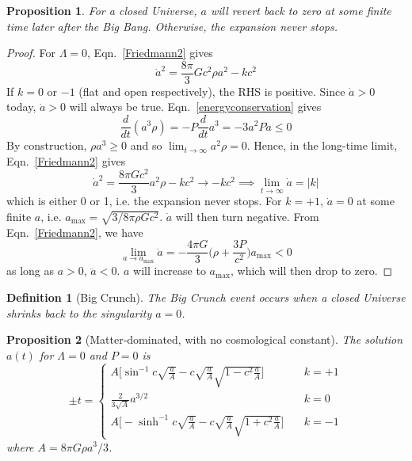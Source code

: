 \documentclass[a4paper]{article}
\theoremstyle{new}
\newtheorem{defi}{Definition}[section]
\newtheorem{prop}{Proposition}[section]
\begin{document}
\begin{prop}
For a closed Universe, $a$ will revert back to zero at some finite time later after the Big Bang. Otherwise, the expansion never stops.
\end{prop}
\begin{proof}
For $\Lambda=0$, Eqn.~\ref{Friedmann2} gives
$$\dot{a}^2=\frac{8\pi}{3}Gc^2\rho a^2-kc^2$$
If $k=0$ or $-1$ (flat and open respectively), the RHS is positive. Since $\dot{a}>0$ today, $\dot{a}>0$ will always be true. Eqn.~\ref{energyconservation} gives
$$\frac{d}{dt}(a^3\rho)=-P\frac{d}{dt}a^3=-3a^2P\dot{a}\leq 0$$
By construction, $\rho a^3\geq0$ and so $\lim_{t\rightarrow\infty}a^2\rho=0$. Hence, in the long-time limit, Eqn.~\ref{Friedmann2} gives
$$\dot{a}^2=\frac{8\pi Gc^2}{3}a^2\rho -kc^2\rightarrow-kc^2\implies\lim_{t\rightarrow\infty}\dot{a}=|k|$$
which is either 0 or 1, i.e. the expansion never stops. For $k=+1$, $\dot{a}=0$ at some finite $a$, i.e. $a_{\text{max}}=\sqrt{3/8\pi\rho Gc^2}$. $\dot{a}$ will then turn negative. From Eqn.~\ref{Friedmann2}, we have
$$\lim_{a\rightarrow a_{\text{max}}}\ddot{a}=-\frac{4\pi G}{3}\bigg(\rho+\frac{3P}{c^2}\bigg)a_{\text{max}}<0$$
as long as $a>0$, $\ddot{a}<0$. $a$ will increase to $a_{\text{max}}$, which will then drop to zero.
\end{proof}
\begin{defi}[Big Crunch]
The Big Crunch event occurs when a closed Universe shrinks back to the singularity $a=0$.
\end{defi}
\begin{prop}[Matter-dominated, with no cosmological constant]
The solution $a(t)$ for $\Lambda=0$ and $P=0$ is
$$\pm t=\begin{cases}
A\bigg[\sin^{-1}c\sqrt{\frac{a}{A}}-c\sqrt{\frac{a}{A}}\sqrt{1-c^2\frac{a}{A}}\bigg]&\quad k=+1\\
\frac{2}{3\sqrt{A}}a^{3/2}&\quad k=0\\
A\bigg[-\sinh^{-1}c\sqrt{\frac{a}{A}}-c\sqrt{\frac{a}{A}}\sqrt{1+c^2\frac{a}{A}}\bigg]&\quad k=-1
\end{cases}$$
where $A=8\pi G\rho a^3/3$.
\end{prop}
\end{document}
